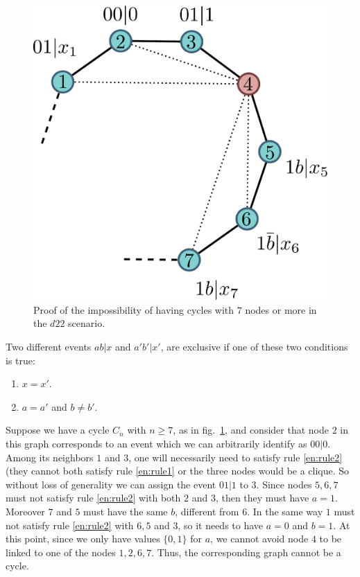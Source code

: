 \documentclass[letterpaper]{article}
\begin{document}
\begin{figure}[h]
    \centering
    \includegraphics[width=.6\columnwidth]{images/cycle_proof.pdf}
    \caption{Proof of the impossibility of having cycles with $7$ nodes or more
    in the $d22$ scenario.}
    \label{fig:cycle_graph_proof}
\end{figure}

Two different events $ab|x$ and $a'b'|x'$, are exclusive if one of these two conditions is true:
\begin{enumerate}
    \item $x=x'$.\label{en:rule1}
    \item $a=a'$ and $b \neq b'$.\label{en:rule2}
\end{enumerate}
Suppose we have a cycle $C_n$ with $n \ge 7$, as in fig.~\ref{fig:cycle_graph_proof},
and consider that node $2$ in this graph corresponds to an event which we can arbitrarily identify as $00|0$.
Among its neighbors $1$ and $3$, one will necessarily need to satisfy rule
\ref{en:rule2} (they cannot both satisfy rule \ref{en:rule1} or the three nodes
would be a clique.
So without loss of generality we can assign the event $01|1$ to $3$.
Since nodes $5,6,7$ must not satisfy rule \ref{en:rule2} with both $2$ and $3$, then they must have $a = 1$.
Moreover $7$ and $5$ must have the same $b$, different from $6$. In the same way $1$ must not satisfy rule \ref{en:rule2} with $6,5$ and $3$, so it
needs to have $a=0$ and $b=1$. At this point, since we only have values
$\{0,1\}$ for $a$, we cannot avoid node $4$ to be linked to one of the nodes
$1,2,6,7$. Thus, the corresponding graph cannot be a cycle.
\end{document}
